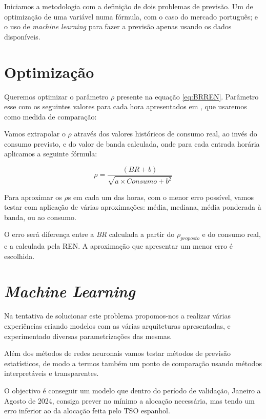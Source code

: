 
Iniciamos a metodologia com a definição de dois problemas de previsão. Um de optimização de uma variável numa fórmula, com o caso do mercado português; e o uso de \textit{machine learning} para fazer a previsão apenas usando os dados disponíveis.\par

\section{Optimização}

Queremos optimizar o parâmetro $\rho$ presente na equação \ref{eq:BRREN}. Parâmetro esse com os seguintes valores para cada hora apresentados em \cite{Carneiro2016}, que usaremos como medida de comparação:\par
\begin{table}[H] \centering \caption{Valores de $\rho$ apresentado em \cite{Carneiro2016}}  \end{table}

Vamos extrapolar o $\rho$ através dos valores históricos de consumo real, ao invés do consumo previsto, e do valor de banda calculada, onde para cada entrada horária aplicamos a seguinte fórmula:\par
\begin{equation} \label{eq:rhoproposed} 
    \rho  = \frac{(BR + b)}{\sqrt{a \times Consumo + b^{2}}}
\end{equation}

Para aproximar os $\rho$s em cada um das horas, com o menor erro possível, vamos testar com aplicação de várias aproximações: média, mediana, média ponderada à banda, ou ao consumo.\par
O erro será diferença entre a \textit{BR} calculada a partir do $\rho_{proposto}$ e do consumo real, e a  calculada pela \gls{REN}. A aproximação que apresentar um menor erro é escolhida.\par


\section{\textit{Machine Learning}}

Na tentativa de solucionar este problema propomos-nos a realizar várias experiências criando modelos com as várias arquiteturas apresentadas, e experimentado diversas parametrizações das mesmas.\par
Além dos métodos de redes neuronais vamos testar métodos de previsão estatísticos, de modo a termos também um ponto de comparação usando métodos interpretáveis e transparentes.\par
O objectivo é conseguir um modelo que dentro do período de validação, Janeiro a Agosto de 2024, consiga prever no mínimo a alocação necessária, mas tendo um erro inferior ao da alocação feita pelo \gls{TSO} espanhol.\par




\thispagestyle{plain}
 \label{se:metneuralnet}

% 

